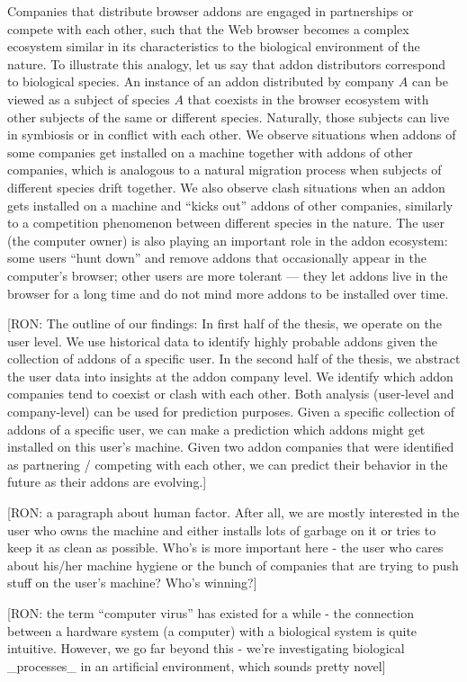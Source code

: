 \documentclass[11pt,oneside]{book}
\begin{document}
Companies that distribute browser addons are engaged in partnerships or compete with each other, such that the Web browser becomes a complex ecosystem similar in its characteristics to the biological environment of the nature. To illustrate this analogy, let us say that addon distributors correspond to biological species. An instance of an addon distributed by company $A$ can be viewed as a subject of species $A$ that coexists in the browser ecosystem with other subjects of the same or different species. Naturally, those subjects can live in symbiosis or in conflict with each other. We observe situations when addons of some companies get installed on a machine together with addons of other companies, which is analogous to a natural migration process when subjects of different species drift together. We also observe clash situations when an addon gets installed on a machine and ``kicks out'' addons of other companies, similarly to a competition phenomenon between different species in the nature. The user (the computer owner) is also playing an important role in the addon ecosystem: some users ``hunt down'' and remove addons that occasionally appear in the computer's browser; other users are more tolerant --- they let addons live in the browser for a long time and do not mind more addons to be installed over time.

[RON: The outline of our findings: In first half of the thesis, we operate on the user level. We use historical data to identify highly probable addons given the collection of addons of a specific user. In the second half of the thesis, we abstract the user data into insights at the addon company level. We identify which addon companies tend to coexist or clash with each other. Both analysis (user-level and company-level) can be used for prediction purposes. Given a specific collection of addons of a specific user, we can make a prediction which addons might get installed on this user's machine. Given two addon companies that were identified as partnering / competing with each other, we can predict their behavior in the future as their addons are evolving.]

[RON: a paragraph about human factor. After all, we are mostly interested in the user who owns the machine and either installs lots of garbage on it or tries to keep it as clean as possible. Who's is more important here - the user who cares about his/her machine hygiene or the bunch of companies that are trying to push stuff on the user's machine? Who's winning?]

[RON: the term ``computer virus'' has existed for a while - the connection between a hardware system (a computer) with a biological system is quite intuitive. However, we go far beyond this - we're investigating biological \_processes\_ in an artificial environment, which sounds pretty novel]
\end{document}
